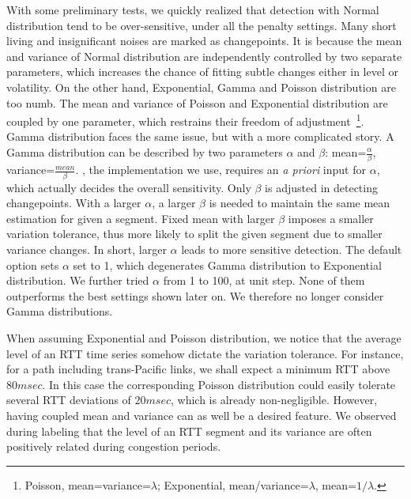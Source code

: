 With some preliminary tests, we quickly realized that detection with Normal distribution tend to be over-sensitive, under all the penalty settings.
Many short living and insignificant noises are marked as changepoints.
It is because the mean and variance of Normal distribution are independently controlled by two separate parameters, which increases the chance of fitting subtle changes either in level or volatility.
On the other hand, Exponential, Gamma and Poisson distribution are too numb.
The mean and variance of Poisson and Exponential distribution are coupled by one parameter,
which restrains their freedom of adjustment~\footnote{Poisson, mean=variance=$\lambda$; Exponential, mean/variance=$\lambda$, mean=$1/\lambda$.}.
Gamma distribution faces the same issue, but with a more complicated story.
A Gamma distribution can be described by two parameters $\alpha$ and $\beta$: mean=$\frac{\alpha}{\beta}$, variance=$\frac{mean}{\beta}$.
\cite{Killick2013a}, the implementation we use, requires an \textit{a priori} input for $\alpha$, which actually decides the overall sensitivity. 
Only $\beta$ is adjusted in detecting changepoints.
With a larger $\alpha$, a larger $\beta$ is needed to maintain the same mean estimation for given a segment.
Fixed mean with larger $\beta$ imposes a smaller variation tolerance, thus more likely to split the given segment due to smaller variance changes.
In short, larger $\alpha$ leads to more sensitive detection.
The default option sets $\alpha$ set to 1, which degenerates Gamma distribution to Exponential distribution. 
We further tried $\alpha$ from 1 to 100, at unit step. 
None of them outperforms the best settings shown later on. 
We therefore no longer consider Gamma distributions.

When assuming Exponential and Poisson distribution, we notice that the average level of an RTT time series somehow dictate the variation tolerance.
For instance, for a path including trans-Pacific links, we shall expect a minimum RTT above $80msec$.
In this case the corresponding Poisson distribution could easily tolerate several RTT deviations of $20msec$, which is already non-negligible.
However, having coupled mean and variance can as well be a desired feature. 
We observed during labeling that the level of an RTT segment and its variance are often positively related during congestion periods. 

